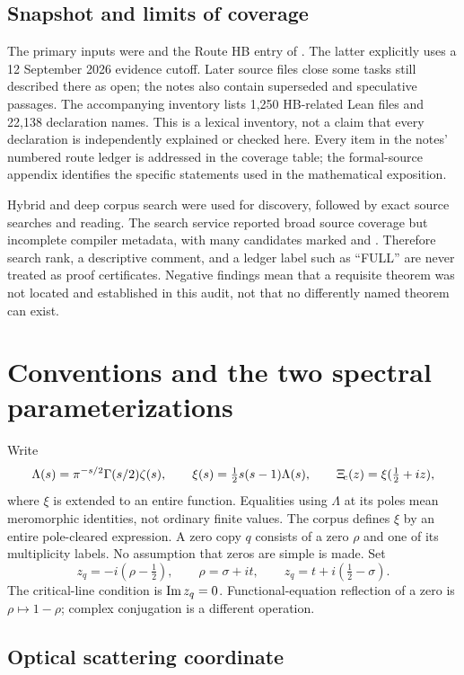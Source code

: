 \subsection{Snapshot and limits of coverage}

The primary inputs were  and the Route HB entry of . The latter explicitly uses a 12 September 2026 evidence cutoff. Later source files close some tasks still described there as open; the notes also contain superseded and speculative passages. The accompanying inventory lists 1,250 HB-related Lean files and 22,138 declaration names. This is a lexical inventory, not a claim that every declaration is independently explained or checked here. Every item in the notes' numbered route ledger is addressed in the coverage table; the formal-source appendix identifies the specific statements used in the mathematical exposition.

Hybrid and deep corpus search were used for discovery, followed by exact source searches and reading. The search service reported broad source coverage but incomplete compiler metadata, with many candidates marked  and . Therefore search rank, a descriptive comment, and a ledger label such as ``FULL'' are never treated as proof certificates. Negative findings mean that a requisite theorem was not located and established in this audit, not that no differently named theorem can exist.

\section{Conventions and the two spectral parameterizations}

Write
\[
\Lambda(s)=\pi^{-s/2}\Gamma(s/2)\zeta(s),\qquad
\xi(s)=\tfrac12s(s-1)\Lambda(s),\qquad
\Xi_{\!c}(z)=\xi(\tfrac12+iz),
\]
where \(\xi\) is extended to an entire function. Equalities using \(\Lambda\) at its poles mean meromorphic identities, not ordinary finite values. The corpus defines \(\xi\) by an entire pole-cleared expression. A zero copy \(q\) consists of a zero \(\rho\) and one of its multiplicity labels. No assumption that zeros are simple is made. Set
\[
 z_q=-i(\rho-\tfrac12),\qquad
 \rho=\sigma+it,\qquad
 z_q=t+i(\tfrac12-\sigma).
\]
The critical-line condition is \(\operatorname{Im} z_q=0\). Functional-equation reflection of a zero is \(\rho\mapsto1-\rho\); complex conjugation is a different operation.

\subsection{Optical scattering coordinate}

